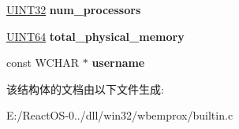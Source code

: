 \begin{DoxyCompactItemize}
\hyperlink{_processor_bind_8h_ae1e6edbbc26d6fbc71a90190d0266018}{U\+I\+N\+T32} {\bfseries num\+\_\+processors}
\item 
\mbox{\label{structrecord__computersystem_a9f43471b8446b7425f995fcdf4c776b6}} 
\hyperlink{_processor_bind_8h_a57be03562867144161c1bfee95ca8f7c}{U\+I\+N\+T64} {\bfseries total\+\_\+physical\+\_\+memory}
\item 
\mbox{\label{structrecord__computersystem_a9b5b96bdb05d30320faa0638cc7d3cbb}} 
const W\+C\+H\+AR $\ast$ {\bfseries username}
\end{DoxyCompactItemize}


该结构体的文档由以下文件生成\+:\begin{DoxyCompactItemize}
\item 
E\+:/\+React\+O\+S-\/0../dll/win32/wbemprox/builtin.\+c\end{DoxyCompactItemize}
